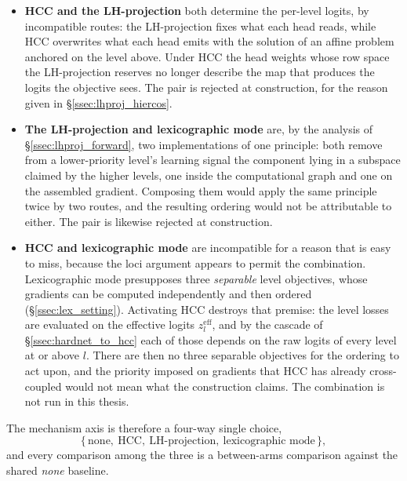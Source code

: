 \begin{itemize}
    \item \textbf{HCC and the LH-projection} both determine the per-level logits,
    by incompatible routes: the LH-projection fixes what each head reads, while
    HCC overwrites what each head emits with the solution of an affine problem
    anchored on the level above. Under HCC the head weights whose row space the
    LH-projection reserves no longer describe the map that produces the logits the
    objective sees. The pair is rejected at construction, for the reason given in
    \S\ref{ssec:lhproj_hiercos}.
    \item \textbf{The LH-projection and lexicographic mode} are, by the analysis
    of \S\ref{ssec:lhproj_forward}, two implementations of one principle: both
    remove from a lower-priority level's learning signal the component lying in a
    subspace claimed by the higher levels, one inside the computational graph and
    one on the assembled gradient. Composing them would apply the same principle
    twice by two routes, and the resulting ordering would not be attributable to
    either. The pair is likewise rejected at construction.
    \item \textbf{HCC and lexicographic mode} are incompatible for a reason that
    is easy to miss, because the loci argument appears to permit the combination.
    Lexicographic mode presupposes three \emph{separable} level objectives, whose
    gradients can be computed independently and then ordered
    (\S\ref{ssec:lex_setting}). Activating HCC destroys that premise: the level
    losses are evaluated on the effective logits $z_l^{\mathrm{eff}}$, and by the
    cascade of \S\ref{ssec:hardnet_to_hcc} each of those depends on the raw logits
    of every level at or above $l$. There are then no three separable objectives
    for the ordering to act upon, and the priority imposed on gradients that HCC
    has already cross-coupled would not mean what the construction claims. The
    combination is not run in this thesis.
\end{itemize}

The mechanism axis is therefore a four-way single choice,
\[
\big\{\,\text{none},\ \text{HCC},\ \text{LH-projection},\ \text{lexicographic mode}\,\big\},
\]
and every comparison among the three is a between-arms comparison against the
shared \emph{none} baseline.

